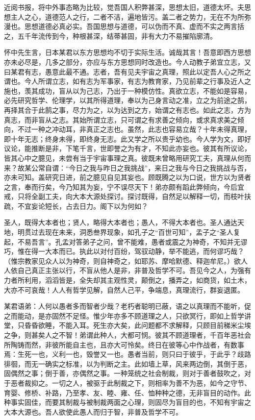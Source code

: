 \documentclass[../../dazhuan.tex]{subfiles}
\begin{document}
\begin{xquote}
近阅书报，将中外事态略为比较，觉吾国人积弊甚深，思想太旧，道德太坏。夫思想主人之心，道德范人之行，二者不洁，遍地皆污。盖二者之势力，无在不为所弥漫也。思想道德必真必实。吾国思想与道德，可以伪而不真、虚而不实之两言括之，五千年流传到今，种根甚深，结蒂甚固，非有大力不易摧陷廓清。 

怀中先生言，日本某君以东方思想均不切于实际生活。诚哉其言！吾意即西方思想亦未必尽是，几多之部分，亦应与东方思想同时改造也。今人动教子弟宜立志，又曰某君有志，愚意此最不通。志者，吾有见夫宇宙之真理，照此以定吾人心之所之谓也。今人所谓立志，如有志为军事家，有志为教育家，乃见前辈之行事及近人之施也，羡其成功，盲从以为己志，乃出于一种模仿性。真欲立志，不能如是容易，必先研究哲学、伦理学，以其所得道理，奉以为己身言动之准，立之为前途之鹄，再择其合于此鹄之事，尽力为之，以为达到之方，始谓之有志也。如此之志，方为真志，而非盲从之志。其始所谓立志，只可谓之有求善之倾向，或求真求美之倾向，不过一种之冲动耳，非真正之志也。虽然，此志也容易立哉？十年未得真理，即十年无志；终身未得，即终身无志。此又学之所以贵乎幼也。今人学为文，即好议论，能推断是非，下笔千言，世即誉之为有才，不知此亦妄也。彼其有所议论，皆其心中之臆见，未尝有当于宇宙事理之真。彼既未曾略用研究工夫，真理从何而来？故某公常自谓：“今日之我与昨日之我挑战”，来日之我与今日之我挑战与否，亦未可知。盖研究日进，前之臆见自见其妄也。顾既腾之以为口说，世方以为贤者之言，奉而行矣，今乃知其为妄，宁不误尽天下！弟亦颇有蹈此弊倾向，今后宜戒，只将全副工夫，向大本大源处探讨。探讨既得，自然足以解释一切，而枝叶扶疏，不宜妄论短长，占去日力。阁下以为何如？ 

圣人，既得大本者也；贤人，略得大本者也；愚人，不得大本者也。圣人通达天地，明贯过去现在未来，洞悉叁界现象，如孔子之“百世可知”，孟子之“圣人复起，不易吾言”。孔孟对答弟子之问，曾不能难，愚者或震之为神奇，不知并无谬巧，惟在得一大本而已。执此以对付百纷，驾驭动静，举不能逃，而何谬巧哉？（惟宗教家见众人以为神奇，则自神奇之，如耶苏、摩哈默德、释迦牟尼。）欲人人依自己真正主张以行，不盲从他人是非，非普及哲学不可。吾见今之人，为强有力者所利用，滔滔皆是，全失却其主观性灵，颠倒之，播弄之，如商货，如土木，大亦不可哀哉！人人有哲学见解，自然人己平，争端息，真理流行，群妄退匿。 

某君语弟：人何以愚者多而智者少哉？老朽者聪明已蔽，语之以真理而不能听，促之而能动，是亦固然不足怪。惟少年亦多不顾道理之人，只欲冥行，即如上哲学讲堂，只昏昏欲睡，不能入耳。死生亦大矣，此问题都不求解释，只顾目前稊米尘埃之争，则甚矣人之不智！弟谓此种人，大都可悯。彼其不顾道理者，千百年恶社会所陶铸而然，非彼所能自主也，且亦大可怜矣。终日在彼等心中作战者，有数事焉：生死一也，义利一也，毁誉又一也。愚者当前，则只曰于彼乎，于此乎？歧路徘徊，而无一确实之标准，以为判断之主。此如墙上草，风来两边倒，其倒于恶，固偶然之事；倒于善，亦偶然之事。一种笼统之社会制裁，则对于善者鼓吹之，对于恶者裁抑之。一切之人，被驱于此制裁之下，则相率为善不为恶，如今之守节、育婴、修桥、补路，乃至孝、友、睦、雍、任、恤种种之德，无非盲目的动作。此种事实固佳，而要其制裁与被制裁两面之心理，则固尽为盲目的也，不知有宇宙之大本大源也。吾人欲使此愚人而归于智，非普及哲学不可。 


\end{xquote}
\end{document}

